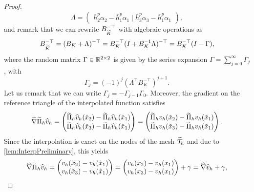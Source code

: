 \documentclass[10pt]{article}
\begin{document}
\begin{proof}
\begin{equation}
	\Lambda = \begin{pmatrix} \bar h_2^p \alpha_2 - \bar h_1^p \alpha_1 \mid \bar h_3^p \alpha_3 - \bar h_1^p \alpha_1 \end{pmatrix},
\end{equation}
and remark that we can rewrite $B_{\widetilde K}^{-\top}$  with algebraic operations as
\begin{equation}
	B_{\widetilde K}^{-\top} = (B_K + \Lambda)^{-\top} = B_K^{-\top}(I + B_K^{-1}\Lambda)^{-\top} = B_K^{-\top}(I - \Gamma),
\end{equation}
where the random matrix $\Gamma\in \mathbb{R}^{2\times 2}$ is given by the series expansion $\Gamma = \sum_{j=0}^\infty \Gamma_j$, with
\begin{equation}
\Gamma_j = (-1)^j (\Lambda^\top B_K^{-\top})^{j+1}.
\end{equation} 
Let us remark that we can write $\Gamma_j = -\Gamma_{j-1} \Gamma_0$. Moreover, the gradient on the reference triangle of the interpolated function satisfies
\begin{equation}
	\widehat\nabla \widetilde \Pi_h \widehat v_h = \begin{pmatrix} \widetilde \Pi_h \widehat v_h(\hat x_2) - \widetilde \Pi_h \widehat v_h(\hat x_1) \\
													 \widetilde \Pi_h \widehat v_h(\hat x_3) - \widetilde \Pi_h \widehat v_h(\hat x_1) \end{pmatrix}
								   = \begin{pmatrix} \widetilde \Pi_h v_h(\tilde x_2) - \widetilde \Pi_h v_h(\tilde x_1) \\
								   					 \widetilde \Pi_h v_h(\tilde x_3) - \widetilde \Pi_h v_h(\tilde x_1) \end{pmatrix}.
\end{equation}
Since the interpolation is exact on the nodes of the mesh $\widetilde{\mathcal T}_h$ and due to \cref{lem:InterpPreliminary}, this yields
\begin{equation}
	\widehat\nabla \widetilde \Pi_h \widehat v_h = \begin{pmatrix} v_h(\tilde x_2) - v_h(\tilde x_1) \\
													 v_h(\tilde x_3) - v_h(\tilde x_1) \end{pmatrix}
								   = \begin{pmatrix} v_h(x_2) - v_h(x_1) \\
								   					 v_h(x_3) - v_h(x_1) \end{pmatrix} + \gamma
								   = \widehat \nabla \widehat v_h + \gamma,
\end{equation}

\end{proof}
\end{document}
